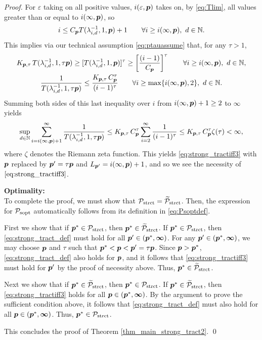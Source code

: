 \documentclass[sort&compress]{elsarticle}
\newcommand{\vinfty}{\boldsymbol{\infty}}
\begin{document}
\begin{proof}
For $\varepsilon$ taking on all positive values, $i(\varepsilon,\boldsymbol{p})$ takes on, by \eqref{eq:Tlim}, all values greater than or equal to $i(\infty,\boldsymbol{p})$, so
\[
i\le C_{\boldsymbol{p}} T(\lambda_{i,d}^{-1},1,\boldsymbol{p})+1 \qquad \forall i \ge i(\infty,\boldsymbol{p}), \ d \in \mathbb{N}.
\]
This implies via our technical assumption \eqref{eq:ptauassume} that, for any $\tau>1$,
\begin{gather*}
 K_{\boldsymbol{p},\tau}\,T (\lambda_{i,d}^{-1},1,\tau \boldsymbol{p}) \ge
 [T(\lambda_{i,d}^{-1},1, \boldsymbol{p})]^\tau
 \ge
  \left[\frac{(i-1)}{C_{\boldsymbol{p}}}\right]^\tau \qquad \forall i \ge i(\infty,\boldsymbol{p}), \ d \in \mathbb{N}, \\
 \frac{1}{T (\lambda_{i,d}^{-1},1,\tau \boldsymbol{p})} \le
\frac{K_{\boldsymbol{p},\tau}\, C_{\boldsymbol{p}}^\tau}{(i-1)^\tau}\qquad \forall i \ge \max\{i(\infty,\boldsymbol{p}),2\}, \ d \in \mathbb{N} .
\end{gather*}
Summing both sides of this last inequality over $i$ from $i(\infty,\boldsymbol{p}) +1 \ge 2$ to $\infty$ yields
\begin{equation*}
\sup_{d\in\mathbb{N}} \sum_{i=i(\infty,\boldsymbol{p}) +1 }^\infty \frac{1}{T (\lambda_{i,d}^{-1},1, \tau \boldsymbol{p})}
 \le  K_{\boldsymbol{p},\tau}\, C_{\boldsymbol{p}}^\tau
\sum_{i=2}^\infty \frac{1}{(i-1)^\tau} \\
 \le K_{\boldsymbol{p},\tau}\, C_{\boldsymbol{p}}^\tau
\zeta (\tau)  < \infty,
\end{equation*}
where $\zeta$ denotes the Riemann zeta function.
This yields \eqref{eq:strong_tractiff3} with $\boldsymbol{p}$ replaced by $\boldsymbol{p}' = \tau \boldsymbol{p}$ and $L_{\boldsymbol{p}'} = i(\infty,\boldsymbol{p}) +1$, and so we see the necessity of $\eqref{eq:strong_tractiff3}$.

\bigskip
\noindent \textbf{Optimality:} \\
To complete the proof, we must show that $\mathcal{P}_{\textup{strct}} = \widetilde{\mathcal{P}}_{\textup{strct}}$.  Then, the expression for  $\mathcal{P}_{\textup{sopt}}$ automatically follows from its definition in \eqref{eq:Psoptdef}.

First we show  that if $\boldsymbol{p}^* \in \mathcal{P}_{\textup{strct}}$, then $\boldsymbol{p}^* \in \widetilde{\mathcal{P}}_{\textup{strct}}$.  If $\boldsymbol{p}^* \in \mathcal{P}_{\textup{strct}}$, then \eqref{eq:strong_tract_def} must hold for all $\vp' \in (\vp^*,\vinfty)$.  For any $\vp' \in (\vp^*,\vinfty)$, we may choose $\boldsymbol{p}$ and $\tau$ such that $\boldsymbol{p}^* < \boldsymbol{p} < \boldsymbol{p}' = \tau \boldsymbol{p}$. Since $\boldsymbol{p} > \boldsymbol{p}^*$, \eqref{eq:strong_tract_def} also holds for $\boldsymbol{p}$, and it follows that \eqref{eq:strong_tractiff3} must hold for $\boldsymbol{p}'$ by the proof of necessity above.  Thus, $\boldsymbol{p}^* \in \widetilde{\mathcal{P}}_{\textup{strct}}$.

Next we show that if $\boldsymbol{p}^* \in \widetilde{\mathcal{P}}_{\textup{strct}}$, then $\boldsymbol{p}^* \in \mathcal{P}_{\textup{strct}}$.  If $\boldsymbol{p}^* \in \widetilde{\mathcal{P}}_{\textup{strct}}$, then \eqref{eq:strong_tractiff3}  holds for all $\vp \in (\vp^*,\vinfty)$.  By the argument to prove the sufficient condition above, it follows that \eqref{eq:strong_tract_def} must also hold for all $\vp \in (\vp^*,\vinfty)$. Thus, $\boldsymbol{p}^* \in \mathcal{P}_{\textup{strct}}$.

\bigskip

\noindent This concludes the proof of  Theorem \ref{thm_main_strong_tract2}. \qed

\end{proof}
\end{document}
